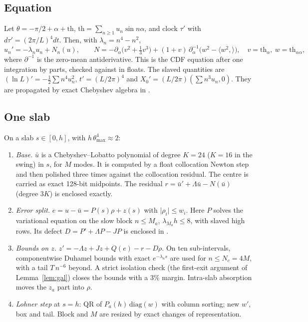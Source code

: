 \documentclass[11pt]{article}
\theoremstyle{definition}
\theoremstyle{remark}
\newcommand{\fn}[1]{\texttt{\detokenize{#1}}}
\newcommand{\ip}[2]{\langle #1,#2\rangle}
\newcommand{\abs}[1]{\lvert #1\rvert}
\begin{document}
\subsection{Equation}
Let $\theta=-\pi/2+\alpha+\mathrm{th}$, $\mathrm{th}=\sum_{n\ge1}u_n\sin n\alpha$, and clock $\tau'$ with $d\tau'=(2\pi/L)^4dt$. Then, with $\lambda_n=n^4-n^2$,
\[
u_n'=-\lambda_nu_n+N_n(u),\qquad N=-\partial_\alpha\bigl(v^2+\tfrac13v^3\bigr)+(1+v)\,\partial_\alpha^{-1}\bigl(w^2-\ip{w^2}{}\bigr),\quad v=\mathrm{th}_\alpha,\ w=\mathrm{th}_{\alpha\alpha},
\]
where $\partial^{-1}$ is the zero-mean antiderivative. This is the CDF equation after one integration by parts, checked against \fn{hls.py} in floats. The slaved quantities are $(\ln L)'=-\frac12\sum n^4u_n^2$, $t'=(L/2\pi)^4$ and $X_0'=(L/2\pi)(\sum n^3u_n,0)$. They are propagated by exact Chebyshev algebra in \fn{arb}.

\subsection{One slab}
On a slab $s\in[0,h]$, with $h\,\theta_{\max}^4\approx2$:
\begin{enumerate}[label=(\arabic*),leftmargin=*]
\item \emph{Base.} $\bar u$ is a Chebyshev--Lobatto polynomial of degree $K=24$ ($K=16$ in the swing) in $s$, for $M$ modes. It is computed by a float collocation Newton step and then polished three times against the \fn{arb} collocation residual. The centre is carried as exact 128-bit midpoints. The residual $r=\bar u'+\Lambda\bar u-N(\bar u)$ (degree $3K$) is enclosed exactly.
\item \emph{Error split.} $e=u-\bar u=P(s)\rho+z(s)$ with $\abs{\rho_i}\le w_i$. Here $P$ solves the variational equation on the slow block $n\le M_a$, $\lambda_{M_a}h\le8$, with slaved high rows. Its defect $D=P'+\Lambda P-JP$ is enclosed in \fn{arb}.
\item \emph{Bounds on $z$.} $z'=-\Lambda z+Jz+Q(e)-r-D\rho$. On ten sub-intervals, componentwise Duhamel bounds with exact $e^{-\lambda_ns}$ are used for $n\le N_c=4M$, with a tail $T\,n^{-6}$ beyond. A strict \fn{arb} isolation check (the first-exit argument of Lemma~\ref{lem:gal}) closes the bounds with a 3\% margin. Intra-slab absorption moves the $z_a$ part into $\rho$.
\item \emph{Lohner step} at $s=h$: QR of $P_a(h)\,\mathrm{diag}(w)$ with column sorting; new $w'$, box and tail. Block and $M$ are resized by exact changes of representation.
\end{enumerate}
\end{document}
